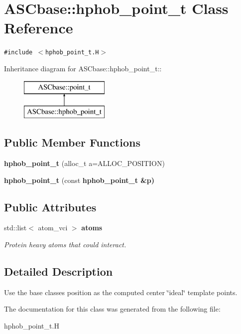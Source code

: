 \section{ASCbase::hphob\_\-point\_\-t Class Reference}
\label{classASCbase_1_1hphob__point__t}
{\tt \#include $<$hphob\_\-point\_\-t.H$>$}

Inheritance diagram for ASCbase::hphob\_\-point\_\-t::\begin{figure}[H]
\begin{center}
\leavevmode
\includegraphics[height=2cm]{classASCbase_1_1hphob__point__t}
\end{center}
\end{figure}
\subsection*{Public Member Functions}
\begin{CompactItemize}
\item 
\textbf{hphob\_\-point\_\-t} (alloc\_\-t a=ALLOC\_\-POSITION)\label{classASCbase_1_1hphob__point__t_e907314b41882b3cb7ba2dee30adb580}

\item 
\textbf{hphob\_\-point\_\-t} (const \bf{hphob\_\-point\_\-t} \&p)\label{classASCbase_1_1hphob__point__t_d1a8e06a18c252ac60c2c5ed9de1b312}

\end{CompactItemize}
\subsection*{Public Attributes}
\begin{CompactItemize}
\item 
std::list$<$ atom\_\-vci $>$ \bf{atoms}\label{classASCbase_1_1hphob__point__t_7e1d90b210cbfb29b6e5fce0cecdd4d8}

\begin{CompactList}\small\item\em Protein heavy atoms that could interact. \item\end{CompactList}\end{CompactItemize}


\subsection{Detailed Description}
Use the base classes position as the computed center \char`\"{}ideal\char`\"{} template points. 



The documentation for this class was generated from the following file:\begin{CompactItemize}
\item 
hphob\_\-point\_\-t.H\end{CompactItemize}
